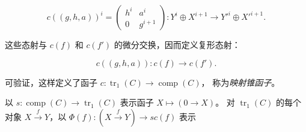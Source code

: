 \begin{equation}
  c((g,h,a))^i=
  \begin{pmatrix}
    h^i & a^i\\
    0 & g^{i+1}
  \end{pmatrix}
  \colon Y^i\oplus X^{i+1}\longrightarrow Y'^i\oplus X'^{i+1}.
  \tag{3.1.2.2}
\end{equation}

这些态射与 $c(f)$ 和 $c(f')$ 的微分交换，因而定义复形态射：

\begin{equation}
  c((g,h,a))\colon c(f)\longrightarrow c(f').
  \tag{3.1.2.3}
\end{equation}

可验证，这样定义了函子
$c\colon\operatorname{tr}_1(C)\longrightarrow\operatorname{comp}(C)$，
称为\emph{映射锥函子}。

以 $s\colon\operatorname{comp}(C)\longrightarrow\operatorname{tr}_1(C)$
表示函子 $X\longmapsto(0\longrightarrow X)$。
对 $\operatorname{tr}_1(C)$ 的每个对象 $X\xrightarrow{f}Y$，以
$\Phi(f)\colon(X\xrightarrow{f}Y)\longrightarrow s c(f)$ 表示
